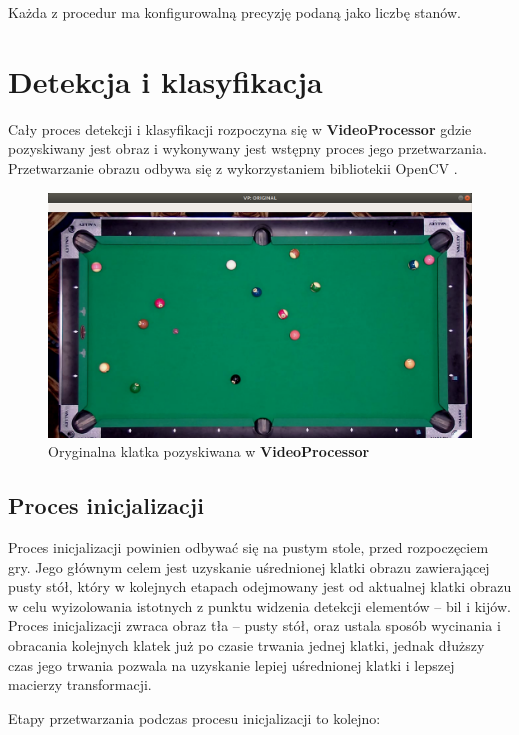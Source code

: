 \documentclass[12pt]{article}
\begin{document}
Każda z procedur ma konfigurowalną precyzję podaną jako liczbę stanów.

\section{Detekcja i klasyfikacja}

Cały proces detekcji i klasyfikacji rozpoczyna się w \textbf{VideoProcessor} gdzie pozyskiwany jest obraz i wykonywany jest wstępny proces jego przetwarzania. Przetwarzanie obrazu odbywa się z wykorzystaniem bibliotekii OpenCV \cite{OpenCV}.

\begin{figure}[!ht]
    \centering
    \includegraphics[width=15cm]{./images/obrazki/vp/original.png}
    \caption{Oryginalna klatka pozyskiwana w \textbf{VideoProcessor}}
    \label{vp_original}
\end{figure}

\subsection{Proces inicjalizacji}

Proces inicjalizacji powinien odbywać się na pustym stole, przed rozpoczęciem gry. Jego głównym celem jest uzyskanie uśrednionej klatki obrazu zawierającej pusty stół, który w kolejnych etapach odejmowany jest od aktualnej klatki obrazu w celu wyizolowania istotnych z punktu widzenia detekcji elementów – bil i kijów. Proces inicjalizacji zwraca obraz tła – pusty stół, oraz ustala sposób wycinania i obracania kolejnych klatek już po czasie trwania jednej klatki, jednak dłuższy czas jego trwania pozwala na uzyskanie lepiej uśrednionej klatki i lepszej macierzy transformacji. 

\newpage
Etapy przetwarzania podczas procesu inicjalizacji to kolejno:
\end{document}
